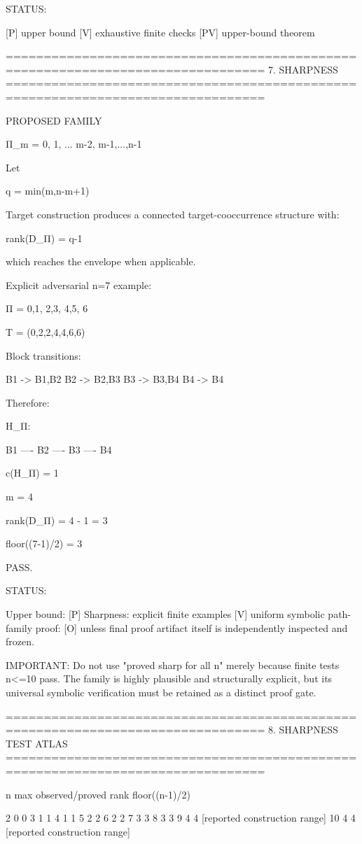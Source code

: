 STATUS:

[P] upper bound
[V] exhaustive finite checks
[PV] upper-bound theorem

================================================================================
7. SHARPNESS
================================================================================

PROPOSED FAMILY

Π_m =
{
 {0},
 {1},
 ...
 {m-2},
 {m-1,...,n-1}
}

Let

q = min(m,n-m+1)

Target construction produces a connected target-cooccurrence structure
with:

rank(D_Π) = q-1

which reaches the envelope when applicable.

Explicit adversarial n=7 example:

Π =
{
 {0,1},
 {2,3},
 {4,5},
 {6}
}

T =
(0,2,2,4,4,6,6)

Block transitions:

B1 -> {B1,B2}
B2 -> {B2,B3}
B3 -> {B3,B4}
B4 -> {B4}

Therefore:

H_Π:

B1 ---- B2 ---- B3 ---- B4

c(H_Π) = 1

m = 4

rank(D_Π) = 4 - 1 = 3

floor((7-1)/2) = 3

PASS.

STATUS:

Upper bound: [P]
Sharpness:
  explicit finite examples [V]
  uniform symbolic path-family proof: [O] unless final proof artifact
  itself is independently inspected and frozen.

IMPORTANT:
Do not use "proved sharp for all n" merely because finite tests n<=10 pass.
The family is highly plausible and structurally explicit, but its universal
symbolic verification must be retained as a distinct proof gate.

================================================================================
8. SHARPNESS TEST ATLAS
================================================================================

n     max observed/proved rank    floor((n-1)/2)

2                 0                       0
3                 1                       1
4                 1                       1
5                 2                       2
6                 2                       2
7                 3                       3
8                 3                       3
9                 4                       4   [reported construction range]
10                4                       4   [reported construction range]


